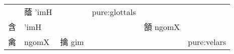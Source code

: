 \documentclass[14pt,a4paper]{scrartcl}
\begin{document}
\begin{longtable}[c]{@{}llllll@{}}
\begin{minipage}[t]{0.14\columnwidth}
\strut\end{minipage} &
\begin{minipage}[t]{0.14\columnwidth}\raggedright\strut
蔭 'imH
\strut\end{minipage} &
\begin{minipage}[t]{0.14\columnwidth}\raggedright\strut
\strut\end{minipage} &
\begin{minipage}[t]{0.14\columnwidth}\raggedright\strut
pure:glottals
\strut\end{minipage}\tabularnewline
\begin{minipage}[t]{0.14\columnwidth}\raggedright\strut
含
\strut\end{minipage} &
\begin{minipage}[t]{0.14\columnwidth}\raggedright\strut
'imH
\strut\end{minipage} &
\begin{minipage}[t]{0.14\columnwidth}\raggedright\strut
\strut\end{minipage} &
\begin{minipage}[t]{0.14\columnwidth}\raggedright\strut
\strut\end{minipage} &
\begin{minipage}[t]{0.14\columnwidth}\raggedright\strut
頷 ngomX
\strut\end{minipage} &
\begin{minipage}[t]{0.14\columnwidth}\raggedright\strut
\strut\end{minipage}\tabularnewline
\begin{minipage}[t]{0.14\columnwidth}\raggedright\strut
禽
\strut\end{minipage} &
\begin{minipage}[t]{0.14\columnwidth}\raggedright\strut
ngomX
\strut\end{minipage} &
\begin{minipage}[t]{0.14\columnwidth}\raggedright\strut
擒 gim
\strut\end{minipage} &
\begin{minipage}[t]{0.14\columnwidth}\raggedright\strut
\strut\end{minipage} &
\begin{minipage}[t]{0.14\columnwidth}\raggedright\strut
\strut\end{minipage} &
\begin{minipage}[t]{0.14\columnwidth}\raggedright\strut
pure:velars
\strut\end{minipage}\tabularnewline
\bottomrule
\end{longtable}
\end{document}
